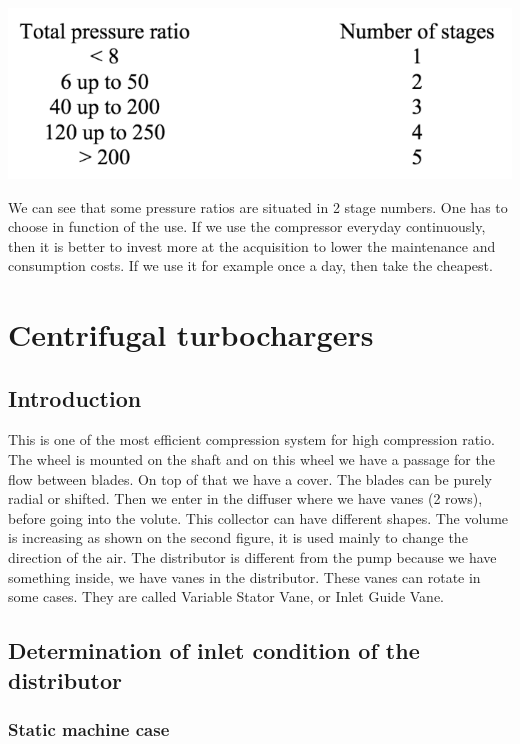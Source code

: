 \begin{center}
\includegraphics[scale=0.8]{ch5/22}
\end{center}

We can see that some pressure ratios are situated in 2 stage numbers. One has to choose in function of the use. If we use the compressor everyday continuously, then it is better to invest more at the acquisition to lower the maintenance and consumption costs. If we use it for example once a day, then take the cheapest. 

\section{Centrifugal turbochargers}
\subsection{Introduction}

This is one of the most efficient compression system for high compression ratio. The wheel is mounted on the shaft and on this wheel we have a passage for the flow between blades. On top of that we have a cover. The blades can be purely radial or shifted. Then we enter in the diffuser where we have vanes (2 rows), before going into the volute. This collector can have different shapes. The volume is increasing as shown on the second figure, it is used mainly to change the direction of the air. The distributor is different from the pump because we have something inside, we have vanes in the distributor. These vanes can rotate in some cases. They are called Variable Stator Vane, or Inlet Guide Vane.

\subsection{Determination of inlet condition of the distributor}
\subsubsection{Static machine case}

